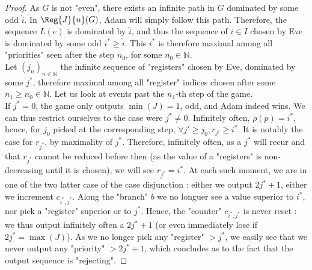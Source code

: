 \documentclass[a4paper,UKenglish,cleveref, autoref, thm-restate]{lipics-v2021}
\newcommand{\NN}{\mathbb{N}}
\renewcommand{\geq}{\geqslant}
\begin{document}
\begin{proof}
	As $G$ is not "even", there exists an infinite path in $G$ dominated by some odd $\hat{i}$.
	In $\Reg{J}{n}(G)$, Adam will simply follow this path. Therefore, the sequence $L(e)$ is dominated by $\hat{i}$, and thus the sequence of $i\in I$ chosen by Eve is dominated by some odd $i^*\geq \hat{i}$. This $i^*$ is therefore maximal among all "priorities" seen after the step $n_0$, for some $n_0 \in \NN$.\\
	Let $(j_n)_{n\in \NN}$ the infinite sequence of "registers" chosen by Eve, dominated by some $j^*$, therefore maximal among all "register" indices chosen after some $n_1 \geq n_0 \in \NN$. Let us look at events past the $n_1$-th step of the game.\\
	If $j^* = 0$, the game only outputs $\min(J) = 1$, odd, and Adam indeed wins. We can thus restrict ourselves to the case were $j^* \neq 0$.
	Infinitely often, $\rho(p) = i^*$, hence, for $j_0$ picked at the corresponding step, $\forall j' \geq j_0, r_{j'}\geq i^*$. It is notably the case for $r_{j^*}$, by maximality of $j^*$. Therefore, infinitely often, as a $j^*$ will recur and that $r_{j^*}$ cannot be reduced before then (as the value of a "registers" is non-decreasing until it is chosen), we will see $r_{j^*} = i^*$. At each such moment, we are in one of the two latter case of the case disjunction : either we output $2j^*+1$, either we increment $c_{i^{*},j^*}$. Along the "branch" $b$ we no longuer see a value superior to $i^*$, nor pick a "register" superior or to $j^*$. Hence, the "counter" $c_{i^*,j^*}$ is never reset : we thus output infinitely often a $2j^{*}+1$ (or even immediately lose if $2j^* = \max(J)$).
	As we no longer pick any "register" $> j^*$, we easily see that we never output any "priority" $>2j^*+1$, which concludes as to the fact that the output sequence is "rejecting".
\end{proof}

\pumping*
\end{document}
